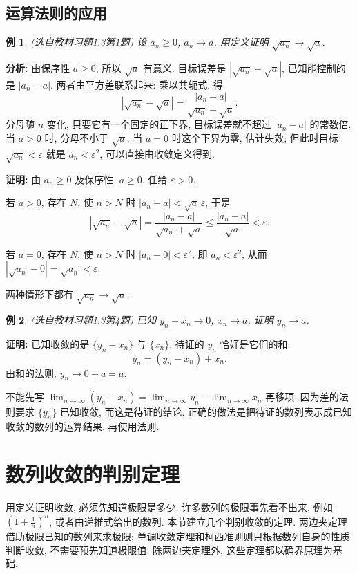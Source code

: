 \documentclass[UTF8,openany]{ctexbook}
\theoremstyle{chinesetextbook}
\newtheorem{example}{例}[section]
\newenvironment{cnproof}{\par\indent\textbf{证明:} \ignorespaces}{\par}
\begin{document}
\subsection{运算法则的应用}
\begin{example}
\textnormal{(选自教材习题1.3第1题)} 设 $a_n\ge0$, $a_n\to a$, 用定义证明 $\sqrt{a_n}\to\sqrt a$.
\end{example}
\par\indent\textbf{分析:} 由保序性 $a\ge0$, 所以 $\sqrt a$ 有意义. 目标误差是 $|\sqrt{a_n}-\sqrt a|$, 已知能控制的是 $|a_n-a|$. 两者由平方差联系起来: 乘以共轭式, 得
\[
|\sqrt{a_n}-\sqrt a|=\frac{|a_n-a|}{\sqrt{a_n}+\sqrt a}.
\]
分母随 $n$ 变化, 只要它有一个固定的正下界, 目标误差就不超过 $|a_n-a|$ 的常数倍. 当 $a>0$ 时, 分母不小于 $\sqrt a$. 当 $a=0$ 时这个下界为零, 估计失效; 但此时目标 $\sqrt{a_n}<\varepsilon$ 就是 $a_n<\varepsilon^2$, 可以直接由收敛定义得到.
\begin{cnproof}
由 $a_n\ge0$ 及保序性, $a\ge0$. 任给 $\varepsilon>0$.

若 $a>0$, 存在 $N$, 使 $n>N$ 时 $|a_n-a|<\sqrt a\,\varepsilon$, 于是
\[
|\sqrt{a_n}-\sqrt a|=\frac{|a_n-a|}{\sqrt{a_n}+\sqrt a}\le\frac{|a_n-a|}{\sqrt a}<\varepsilon.
\]

若 $a=0$, 存在 $N$, 使 $n>N$ 时 $|a_n-0|<\varepsilon^2$, 即 $a_n<\varepsilon^2$, 从而 $|\sqrt{a_n}-0|=\sqrt{a_n}<\varepsilon$.

两种情形下都有 $\sqrt{a_n}\to\sqrt a$.
\end{cnproof}
\begin{example}
\textnormal{(选自教材习题1.3第4题)} 已知 $y_n-x_n\to0$, $x_n\to a$, 证明 $y_n\to a$.
\end{example}
\begin{cnproof}
已知收敛的是 $\{y_n-x_n\}$ 与 $\{x_n\}$, 待证的 $y_n$ 恰好是它们的和:
\[
y_n=(y_n-x_n)+x_n.
\]
由和的法则, $y_n\to0+a=a$.
\end{cnproof}
不能先写 $\displaystyle\lim_{n\to\infty}(y_n-x_n)=\lim_{n\to\infty}y_n-\lim_{n\to\infty}x_n$ 再移项, 因为差的法则要求 $\{y_n\}$ 已知收敛, 而这是待证的结论. 正确的做法是把待证的数列表示成已知收敛的数列的运算结果, 再使用法则.
\section{数列收敛的判别定理}
用定义证明收敛, 必须先知道极限是多少. 许多数列的极限事先看不出来, 例如 $\displaystyle\left(1+\frac1n\right)^n$, 或者由递推式给出的数列. 本节建立几个判别收敛的定理. 两边夹定理借助极限已知的数列来求极限; 单调收敛定理和柯西准则则只根据数列自身的性质判断收敛, 不需要预先知道极限值. 除两边夹定理外, 这些定理都以确界原理为基础.
\end{document}
